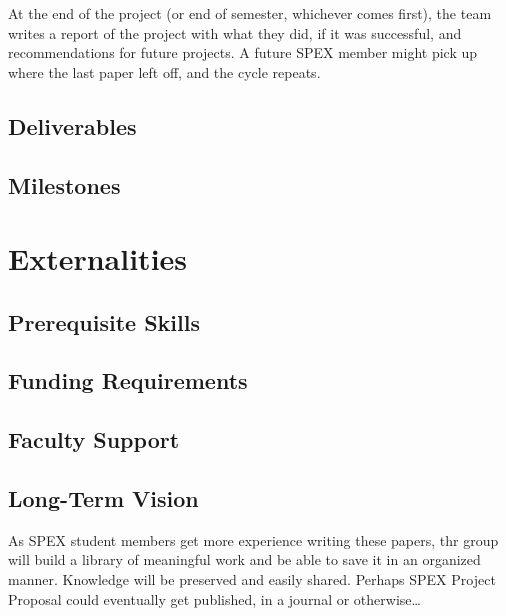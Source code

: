 \documentclass[journal]{SPEXformat}
\begin{document}
At the end of the project (or end of semester, whichever comes first), the team writes a report of the project with what they did, if it was successful, and recommendations for future projects.
A future SPEX member might pick up where the last paper left off, and the cycle repeats.

\subsection{Deliverables}
\label{subsec:deliverables}

\subsection{Milestones}
\label{subsec:milestones}

\section{Externalities}

\subsection{Prerequisite Skills}

\subsection{Funding Requirements}

\subsection{Faculty Support}

\subsection{Long-Term Vision}
\label{sec:vision}
As SPEX student members get more experience writing these papers, thr group will build a library of meaningful work and be able to save it in an organized manner.
Knowledge will be preserved and easily shared.
Perhaps SPEX Project Proposal could eventually get published, in a journal or otherwise\ldots
\end{document}
